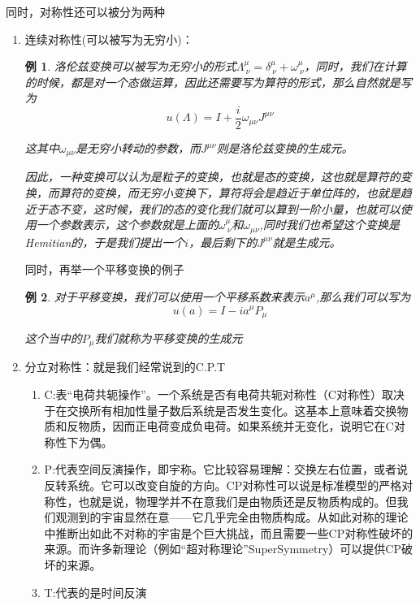 \documentclass{article}
\newtheorem{example}{例}
\begin{document}
同时，对称性还可以被分为两种
\begin{enumerate}
    \item 连续对称性(可以被写为无穷小)：
    \begin{example}
        洛伦兹变换可以被写为无穷小的形式$\varLambda_{\ \nu}^\mu=\delta^\mu_{\ \nu}+\omega^\mu_{\ \nu}$，同时，我们在计算的时候，都是对一个态做运算，因此还需要写为算符的形式，那么自然就是写为
        \begin{equation*}
            u(\varLambda)=I+\frac{i}{2}\omega_{\mu\nu}J^{\mu\nu}   
        \end{equation*}

        这其中$\omega_{\mu\nu}$是无穷小转动的参数，而$J^{\mu\nu}$则是洛伦兹变换的生成元。
        
        因此，一种变换可以认为是粒子的变换，也就是态的变换，这也就是算符的变换，而算符的变换，而无穷小变换下，算符将会是趋近于单位阵的，也就是趋近于态不变，这时候，我们的态的变化我们就可以算到一阶小量，也就可以使用一个参数表示，这个参数就是上面的$\omega^\mu_{\ \nu}$和$\omega_{\mu\nu}$,同时我们也希望这个变换是Hemitian的，于是我们提出一个$i$，最后剩下的$J^{\mu\nu}$就是生成元。
    \end{example}

    同时，再举一个平移变换的例子
    \begin{example}
        对于平移变换，我们可以使用一个平移系数来表示$a^\mu$,那么我们可以写为
        \begin{equation*}
            u(a)=I-ia^\mu P_\mu
        \end{equation*}

        这个当中的$P_\mu$我们就称为平移变换的生成元
    \end{example}
    
    \item 分立对称性：就是我们经常说到的C.P.T
    \begin{enumerate}
        \item C:表“电荷共轭操作”。一个系统是否有电荷共轭对称性（C对称性）取决于在交换所有相加性量子数后系统是否发生变化。这基本上意味着交换物质和反物质，因而正电荷变成负电荷。如果系统并无变化，说明它在C对称性下为偶。
        \item P:代表空间反演操作，即宇称。它比较容易理解：交换左右位置，或者说反转系统。它可以改变自旋的方向。CP对称性可以说是标准模型的严格对称性，也就是说，物理学并不在意我们是由物质还是反物质构成的。但我们观测到的宇宙显然在意——它几乎完全由物质构成。从如此对称的理论中推断出如此不对称的宇宙是个巨大挑战，而且需要一些CP对称性破坏的来源。而许多新理论（例如“超对称理论”SuperSymmetry）可以提供CP破坏的来源。
        \item T:代表的是时间反演
    \end{enumerate}
\end{enumerate}
\end{document}
